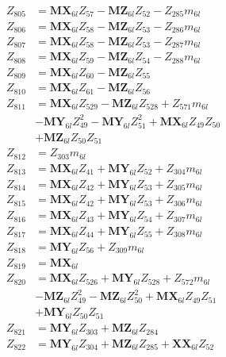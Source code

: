 \begin{multicols}{2}
\begin{align}
Z_{805} &= \mathbf{MX}_{6l}Z_{57} - \mathbf{MZ}_{6l}Z_{52} - Z_{285}m_{6l} \nonumber \\
Z_{806} &= \mathbf{MX}_{6l}Z_{58} - \mathbf{MZ}_{6l}Z_{53} - Z_{286}m_{6l} \nonumber \\
Z_{807} &= \mathbf{MX}_{6l}Z_{58} - \mathbf{MZ}_{6l}Z_{53} - Z_{287}m_{6l} \nonumber \\
Z_{808} &= \mathbf{MX}_{6l}Z_{59} - \mathbf{MZ}_{6l}Z_{54} - Z_{288}m_{6l} \nonumber \\
Z_{809} &= \mathbf{MX}_{6l}Z_{60} - \mathbf{MZ}_{6l}Z_{55} \nonumber \\
Z_{810} &= \mathbf{MX}_{6l}Z_{61} - \mathbf{MZ}_{6l}Z_{56} \nonumber \\
Z_{811} &= \mathbf{MX}_{6l}Z_{529} - \mathbf{MZ}_{6l}Z_{528} + Z_{571}m_{6l}  \nonumber \\
&- \mathbf{MY}_{6l}Z_{49}^2 - \mathbf{MY}_{6l}Z_{51}^2 + \mathbf{MX}_{6l}Z_{49}Z_{50}  \nonumber \\
&+ \mathbf{MZ}_{6l}Z_{50}Z_{51} \nonumber \\
Z_{812} &= Z_{303}m_{6l} \nonumber \\
Z_{813} &= \mathbf{MX}_{6l}Z_{41} + \mathbf{MY}_{6l}Z_{52} + Z_{304}m_{6l} \nonumber \\
Z_{814} &= \mathbf{MX}_{6l}Z_{42} + \mathbf{MY}_{6l}Z_{53} + Z_{305}m_{6l} \nonumber \\
Z_{815} &= \mathbf{MX}_{6l}Z_{42} + \mathbf{MY}_{6l}Z_{53} + Z_{306}m_{6l} \nonumber \\
Z_{816} &= \mathbf{MX}_{6l}Z_{43} + \mathbf{MY}_{6l}Z_{54} + Z_{307}m_{6l} \nonumber \\
Z_{817} &= \mathbf{MX}_{6l}Z_{44} + \mathbf{MY}_{6l}Z_{55} + Z_{308}m_{6l} \nonumber \\
Z_{818} &= \mathbf{MY}_{6l}Z_{56} + Z_{309}m_{6l} \nonumber \\
Z_{819} &= \mathbf{MX}_{6l} \nonumber \\
Z_{820} &= \mathbf{MX}_{6l}Z_{526} + \mathbf{MY}_{6l}Z_{528} + Z_{572}m_{6l}  \nonumber \\
&- \mathbf{MZ}_{6l}Z_{49}^2 - \mathbf{MZ}_{6l}Z_{50}^2 + \mathbf{MX}_{6l}Z_{49}Z_{51}  \nonumber \\
&+ \mathbf{MY}_{6l}Z_{50}Z_{51} \nonumber \\
Z_{821} &= \mathbf{MY}_{6l}Z_{303} + \mathbf{MZ}_{6l}Z_{284} \nonumber \\
Z_{822} &= \mathbf{MY}_{6l}Z_{304} + \mathbf{MZ}_{6l}Z_{285} + \mathbf{XX}_{6l}Z_{52}  \nonumber \\

\end{align}
\end{multicols}

